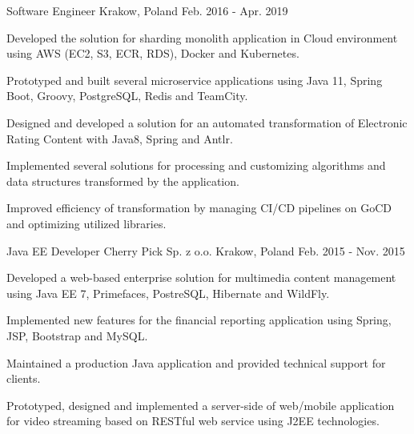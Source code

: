\begin{cventries}
  \cventry
    {Software Engineer} %
    { } %
    {Krakow, Poland} %
    {Feb. 2016 - Apr. 2019} %
    {
      \begin{cvitems} %
        \item {Developed the solution for sharding monolith application in Cloud environment using AWS (EC2, S3, ECR, RDS), Docker and Kubernetes.}
        \item {Prototyped and built several microservice applications using Java 11, Spring Boot, Groovy, PostgreSQL, Redis and TeamCity.}
        \item {Designed and developed a solution for an automated transformation of Electronic Rating Content with Java8, Spring and Antlr.}
        \item {Implemented several solutions for processing and customizing algorithms and data structures transformed by the application.}
        \item {Improved efficiency of transformation by managing CI/CD pipelines on GoCD and optimizing utilized libraries.}
      \end{cvitems}
    }

  \cventry
    {Java EE Developer} %
    {Cherry Pick Sp. z o.o.} %
    {Krakow, Poland} %
    {Feb. 2015 - Nov. 2015} %
    {
      \begin{cvitems} %
        \item {Developed a web-based enterprise solution for multimedia content management using
Java EE 7, Primefaces, PostreSQL, Hibernate and WildFly.}
		\item {Implemented new features for the financial reporting application using Spring, JSP, Bootstrap and MySQL.}
		\item {Maintained a production Java application and provided technical support for clients.}
        \item {Prototyped, designed and implemented a server-side of web/mobile
application for video streaming based on RESTful web service using J2EE technologies.}
      \end{cvitems}
    }


\end{cventries}
